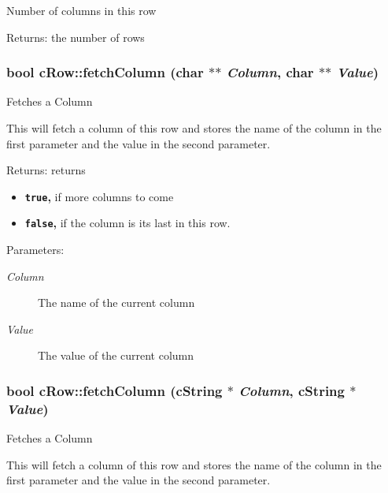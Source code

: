 Number of columns in this row

\begin{Desc}
\item[Returns:]the number of rows \end{Desc}
\hypertarget{classcRow_a2dcc3d44451c793483493502ef72eb1}{
\subsubsection[{fetchColumn}]{\setlength{\rightskip}{0pt plus 5cm}bool cRow::fetchColumn (char $\ast$$\ast$ {\em Column}, \/  char $\ast$$\ast$ {\em Value})}}
\label{classcRow_a2dcc3d44451c793483493502ef72eb1}


Fetches a Column

This will fetch a column of this row and stores the name of the column in the first parameter and the value in the second parameter.

\begin{Desc}
\item[Returns:]returns\begin{itemize}
\item {\bf {\tt true},} if more columns to come\item {\bf {\tt false},} if the column is its last in this row. \end{itemize}
\end{Desc}
\begin{Desc}
\item[Parameters:]
\begin{description}
\item[{\em Column}]The name of the current column \item[{\em Value}]The value of the current column \end{description}
\end{Desc}
\hypertarget{classcRow_4b1e1e5ffe36d35c61476bc2e4ef4eb1}{
\subsubsection[{fetchColumn}]{\setlength{\rightskip}{0pt plus 5cm}bool cRow::fetchColumn (cString $\ast$ {\em Column}, \/  cString $\ast$ {\em Value})}}
\label{classcRow_4b1e1e5ffe36d35c61476bc2e4ef4eb1}


Fetches a Column

This will fetch a column of this row and stores the name of the column in the first parameter and the value in the second parameter.

